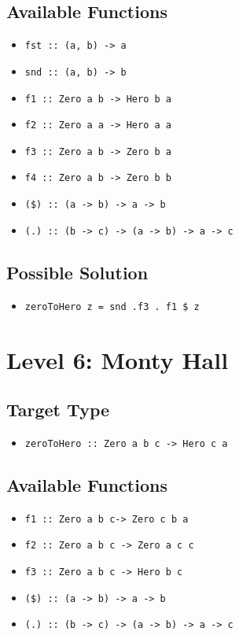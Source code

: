 \subsection{Available Functions} 
\begin{itemize}
    \item \texttt{fst :: (a, b) -> a}
    \item \texttt{snd :: (a, b) -> b}
    \item \texttt{f1 :: Zero a b -> Hero b a}
    \item \texttt{f2 :: Zero a a -> Hero a a}
    \item \texttt{f3 :: Zero a b -> Zero b a}
    \item \texttt{f4 :: Zero a b -> Zero b b}
    \item \texttt{(\$) :: (a -> b) -> a -> b}
    \item \texttt{(.) :: (b -> c) -> (a -> b) -> a -> c}
\end{itemize}

\subsection{Possible Solution} 
\begin{itemize}
    \item \texttt{zeroToHero z = snd .f3 . f1 \$ z}
\end{itemize}


\section{Level 6: Monty Hall}
\subsection{Target Type } 
\begin{itemize}
    \item \texttt{zeroToHero :: Zero a b c -> Hero c a}
\end{itemize}

\subsection{Available Functions} 
\begin{itemize}
    \item \texttt{f1 :: Zero a b c-> Zero c b a}
    \item \texttt{f2 :: Zero a b c -> Zero a c c}
    \item \texttt{f3 :: Zero a b c -> Hero b c}
    \item \texttt{(\$) :: (a -> b) -> a -> b}
    \item \texttt{(.) :: (b -> c) -> (a -> b) -> a -> c}
\end{itemize}

